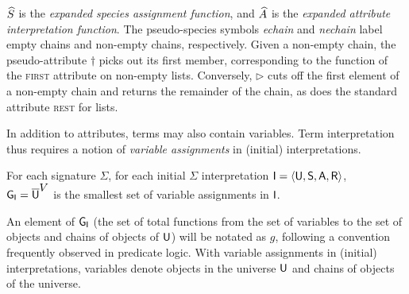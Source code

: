 \documentclass[output=paper
                ,modfonts
                ,nonflat
	        ,collection
	        ,collectionchapter
	        ,collectiontoclongg
 	        ,biblatex
                ,babelshorthands
                ,newtxmath
                ,draftmode
                ,colorlinks, citecolor=brown
]{./langsci/langscibook}
\begin{document}
{$\widehat{S}$ is the \emph{expanded species assignment function}, and
$\widehat{A}$ is the  \emph{expanded attribute interpretation function}.
The pseudo-species symbols \textit{echain} and \textit{nechain} label
empty chains and non-empty chains, respectively. Given a non-empty
chain, the pseudo-attribute $\dagger$ picks out its first member,
corresponding to the function of the \textsc{first} attribute on non-empty
lists. Conversely, $\triangleright$ cuts off the first element
of a non-empty chain and returns the remainder of the chain, as does the
standard attribute \textsc{rest} for lists.

In addition to attributes, terms may also contain variables. Term
interpretation thus requires a notion of \emph{variable assignments} in
(initial) interpretations.

\begin{mydef}
  For each signature $\Sigma$,
  for each initial $\Sigma$ interpretation $\mathsf{I}=\langle\mathsf{U},\mathsf{S},\mathsf{A},\mathsf{R}\rangle$,\\
  $\mathsf{G}_{\mathsf{I}}=\overline{\mathsf{U}}^{\mbox{$V$}}$ is the smallest set of variable
  assignments in $\mathsf{I}$.
\end{mydef}

An element of $\mathsf{G}_{\mathsf{I}}$ (the set of total functions from the
set of variables to the set of objects and chains of objects of
$\mathsf{U}$) will be notated as $g$, following a convention frequently
observed in predicate logic.  With variable assignments in (initial)
interpretations, variables denote objects in the universe $\mathsf{U}$
and chains of objects of the universe.


}
\end{document}
